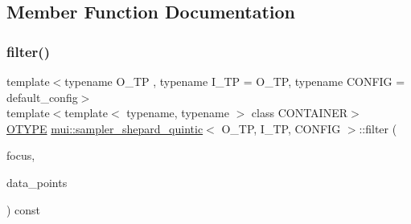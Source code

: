 \subsection{Member Function Documentation}
\mbox{\label{classmui_1_1sampler__shepard__quintic_ab0dcfc9f150013f4fb81a8cc4e0a3d70}} 
\subsubsection{\texorpdfstring{filter()}{filter()}}
{\footnotesize\ttfamily template$<$typename O\+\_\+\+TP , typename I\+\_\+\+TP  = O\+\_\+\+TP, typename C\+O\+N\+F\+IG  = default\+\_\+config$>$ \\
template$<$template$<$ typename, typename $>$ class C\+O\+N\+T\+A\+I\+N\+ER$>$ \\
\hyperlink{classmui_1_1sampler__shepard__quintic_ae71df3379dbdc49abd163d49eb310411}{O\+T\+Y\+PE} \hyperlink{classmui_1_1sampler__shepard__quintic}{mui\+::sampler\+\_\+shepard\+\_\+quintic}$<$ O\+\_\+\+TP, I\+\_\+\+TP, C\+O\+N\+F\+IG $>$\+::filter (\begin{DoxyParamCaption}\item[{\hyperlink{classmui_1_1sampler__shepard__quintic_ac80518ba9645191b9d6e2fbee760e031}{point\+\_\+type}}]{focus,  }\item[{const C\+O\+N\+T\+A\+I\+N\+ER$<$ \hyperlink{classmui_1_1sampler__shepard__quintic_a449ad1b058df2448a50dab7822626fa6}{I\+T\+Y\+PE}, C\+O\+N\+F\+IG $>$ \&}]{data\+\_\+points }\end{DoxyParamCaption}) const\hspace{0.3cm}{\ttfamily [inline]}}

\mbox{\label{classmui_1_1sampler__shepard__quintic_a6b8885e07ba9265713d5a6256c1851e5}} 
